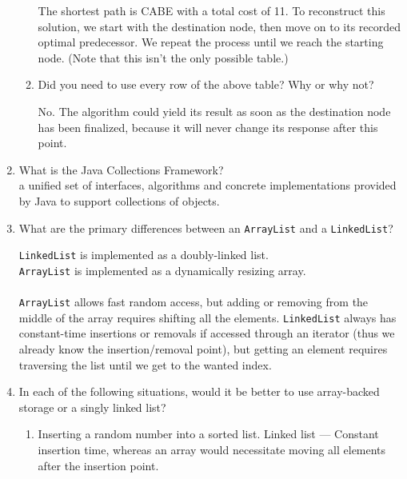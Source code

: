 \documentclass[11pt]{article}
\newenvironment{answer}{\large\lstset{basicstyle=\tiny\ttfamily}\color{white} }{}
\newenvironment{answer}{\large\lstset{basicstyle=\large\ttfamily}\color{red} }{}
\begin{document}
\begin{enumerate}
\begin{enumerate}
\begin{answer}
The shortest path is CABE with a total cost of 11.
To reconstruct this solution, we start with the destination node, then move on to its recorded optimal predecessor.
We repeat the process until we reach the starting node.
(Note that this isn't the only possible table.)
\end{answer}

\item
Did you need to use every row of the above table? Why or why not?

\begin{answer}
No. The algorithm could yield its result as soon as the destination node has been finalized, because it will never change its response after this point.
\end{answer}
\end{enumerate}


\newpage
\item What is the Java Collections Framework? \\
\begin{answer}
    a unified set of interfaces, algorithms and concrete implementations
provided by Java to support collections of objects.
\end{answer}


\vspace{24pt}
\item What are the primary differences between an \texttt{ArrayList} and a \texttt{LinkedList}?

\begin{answer}
\texttt{LinkedList} is implemented as a doubly-linked list.
\\\texttt{ArrayList} is implemented as a dynamically resizing array.
\\ \\\texttt{ArrayList} allows fast random access, but adding or removing from the middle of the array
requires shifting all the elements. \texttt{LinkedList} always has constant-time insertions or removals
if accessed through an iterator (thus we already know the insertion/removal point), but getting
an element requires traversing the list until we get to the wanted index.
\end{answer}
	
\vspace{24pt}
\item In each of the following situations, would it be better to use array-backed storage or a singly linked list?
\begin{enumerate}
	\item Inserting a random number into a sorted list.
	\begin{answer}
	Linked list --- Constant insertion time, whereas an array would necessitate moving all elements after the insertion point.
	\end{answer}
	

\end{enumerate}
\end{enumerate}
\end{document}

